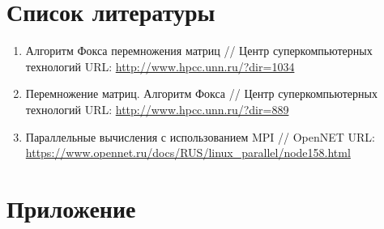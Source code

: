 \documentclass[12pt,a4paper]{extarticle}
\begin{document}
\section*{Список литературы}
\begin{enumerate}
	\item Алгоритм Фокса перемножения матриц // Центр суперкомпьютерных технологий URL: \url{http://www.hpcc.unn.ru/?dir=1034}
	\item Перемножение матриц. Алгоритм Фокса // Центр суперкомпьютерных технологий URL: \url{http://www.hpcc.unn.ru/?dir=889}
	\item Параллельные вычисления с использованием MPI // OpenNET URL: \url{https://www.opennet.ru/docs/RUS/linux_parallel/node158.html}
\end{enumerate}
\newpage

\section*{Приложение}
\end{document}
